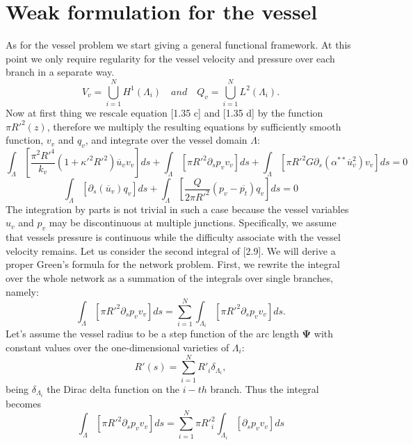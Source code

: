 \documentclass[a4paper]{report}
\begin{document}
\section{Weak formulation for the vessel}
As for the vessel problem we start giving a general functional framework. At this point we only require regularity for the vessel velocity and pressure over each branch in a separate way.
\begin{equation}
V_v=\bigcup^N_{i=1} H^1(\Lambda_i) \quad and \quad Q_v= \bigcup^N_{i=1}L^2(\Lambda_i).
\end{equation}
Now at first thing we rescale equation [1.35 c] and [1.35 d] by the function $\pi R'^2(z)$, therefore we multiply the resulting equations by sufficiently smooth function, $v_v$ and $q_v$, and integrate over the vessel domain $\Lambda$:
\begin{equation}
\int_{\Lambda} [\frac{\pi^2 R'^4}{k_v}(1+\kappa'^2 R'^2) \overline{u}_v v_v]ds+\int_{\Lambda}[ \pi R'^2 \partial_{s} p_v v_v]ds +\int_{\Lambda}[ \pi R'^2  G \partial_{s} (\alpha^{**}\overline{u}_v^2) v_v]ds=0
\end{equation}
\begin{equation}
\int_{\Lambda}[\partial_{s} ( \overline{u}_v)q_v ]ds+\int_{\Lambda} [\frac{Q}{2 \pi R'^2} (p_v - \overline{p_t})q_v] ds=0
\end{equation}
The integration by parts is not trivial in such a case because the vessel variables $u_v$ and $p_v$ may be discontinuous at multiple junctions. Specifically, we assume that vessels pressure is continuous while the difficulty associate with the vessel velocity remains. Let us consider the second integral of [2.9]. We will derive a proper Green's formula for the network problem. First, we rewrite the integral over the whole network as a summation of the integrals over single branches, namely:
\begin{equation*}
\int_{\Lambda} [\pi R'^2 \partial_s p_v v_v]ds=\sum^N_{i=1}\int_{\Lambda_i}[\pi R'^2 \partial_s p_v v_v]ds.
\end{equation*}
Let's assume the vessel radius to be a step function of the arc length $\boldsymbol{\Psi}$ with constant values over the one-dimensional varieties of $\Lambda_i$:
\begin{equation*}
R'(s)=\sum^N_{i=1} R'_i \delta_{\Lambda_i},
\end{equation*}
being $\delta_{\Lambda_i}$ the Dirac delta function on the $i-th$ branch. Thus the integral becomes
\begin{equation*}
\int_{\Lambda} [\pi R'^2 \partial_s p_v v_v]ds=\sum^N_{i=1}\pi R'^2_i  \int_{\Lambda_i}[\partial_s p_v v_v]ds
\end{equation*}
\end{document}
